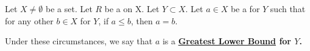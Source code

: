 \label{def:GreatestLowerBound}

\newcommand{\GreatestLowerBound}[0]{
    \bf \hyperref[def:GreatestLowerBound]{Greatest Lower Bound} \rm
}

\newcommand{\Inf}[0]{
    \bf \hyperref[def:GreatestLowerBound]{Inf} \rm
}

\newcommand{\Infimum}[0]{
    \bf \hyperref[def:GreatestLowerBound]{Infimum} \rm
}

\begin{df}
    Let $X \neq \emptyset$ be a set. 
    Let $R$ be a \Relation on X. 
    Let $Y \subset X$.
    Let $a \in X$ be a \LowerBound for $Y$
    such that for any other
    \LowerBound $b \in X$ for $Y$, if 
    $a \leq b$, then $a = b$.
    
    Under these circumstances, we say that $a$ 
    is a \GreatestLowerBound for $Y$. 
\end{df}